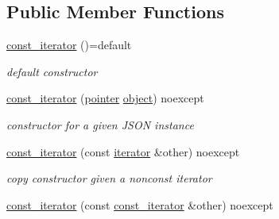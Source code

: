 \subsection*{Public Member Functions}
\begin{DoxyCompactItemize}
\item 
\hyperlink{a00038_ac6fdaff67857f82a623e5cc253917639}{const\+\_\+iterator} ()=default\hypertarget{a00038_ac6fdaff67857f82a623e5cc253917639}{}\label{a00038_ac6fdaff67857f82a623e5cc253917639}

\begin{DoxyCompactList}\small\item\em default constructor \end{DoxyCompactList}\item 
\hyperlink{a00038_a23de834b11bd895209aa65c100ab9ceb}{const\+\_\+iterator} (\hyperlink{a00038_a1da96fc3054d547e7706d3a2f073f389}{pointer} \hyperlink{a00025_ad25b2f8c21e241e2d63455537a9294ff}{object}) noexcept\hypertarget{a00038_a23de834b11bd895209aa65c100ab9ceb}{}\label{a00038_a23de834b11bd895209aa65c100ab9ceb}

\begin{DoxyCompactList}\small\item\em constructor for a given J\+S\+ON instance \end{DoxyCompactList}\item 
\hyperlink{a00038_a6b950c6bc081ac1ec1540ec05ceb2603}{const\+\_\+iterator} (const \hyperlink{a00079}{iterator} \&other) noexcept\hypertarget{a00038_a6b950c6bc081ac1ec1540ec05ceb2603}{}\label{a00038_a6b950c6bc081ac1ec1540ec05ceb2603}

\begin{DoxyCompactList}\small\item\em copy constructor given a nonconst iterator \end{DoxyCompactList}\item 
\hyperlink{a00038_a18c35a6735d3da96b4fc026421c05dd8}{const\+\_\+iterator} (const \hyperlink{a00038}{const\+\_\+iterator} \&other) noexcept\hypertarget{a00038_a18c35a6735d3da96b4fc026421c05dd8}{}\label{a00038_a18c35a6735d3da96b4fc026421c05dd8}


\end{DoxyCompactItemize}

